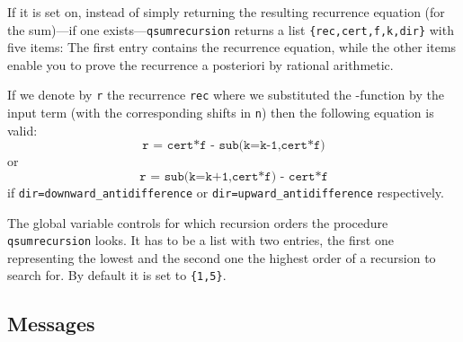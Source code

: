 \begin{itemize}
		If it is set on, instead of simply returning the
		resulting recurrence equation (for the sum)---if one
		exists---\texttt{qsumrecursion} returns
		a list \texttt{\{rec,cert,f,k,dir\}} with
		five items: The first entry contains the
		recurrence equation, while the other items enable you to
		prove the recurrence a posteriori by rational arithmetic.

		If we denote by \texttt{r} the recurrence
		\texttt{rec} where we substituted the \verb@summ@-function
		by the input term \verb@f@ (with the corresponding shifts
		in \texttt{n}) then the following equation is valid:
		\[  \texttt{r = cert*f - sub(k=k-1,cert*f)}  \]
		or
		\[  \texttt{r = sub(k=k+1,cert*f) - cert*f}  \]
		if \texttt{dir=downward\_antidifference} or
		\texttt{dir=upward\_antidifference} respectively.
\end{itemize}

The global variable  controls for
which recursion orders the procedure \texttt{qsumrecursion} looks.
It has to be a list with two entries, the first one representing
the lowest and the second one the highest order of a recursion
to search for. By default it is set to \texttt{\{1,5\}}.


\subsection{Messages}

